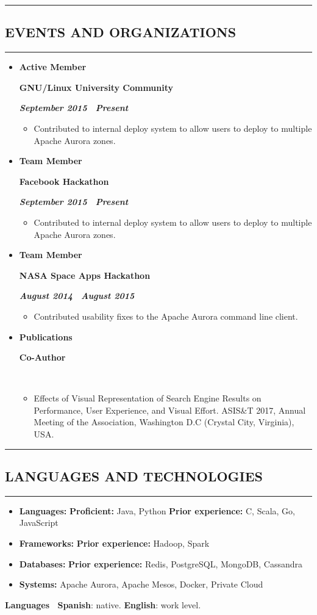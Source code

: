 \documentclass[10pt,letterpaper]{article}
\newcommand{\textbox}[1]{
  \parbox{.333\textwidth}{#1}
}
\newcommand{\CPP}
{C\nolinebreak[4]\hspace{-.05em}\raisebox{.22ex}{\footnotesize\bf ++}}
\newcommand{\sectionTitle}[1]{
  \hrule
  \vspace{-1.0em} 
  \subsection*{\uppercase{\textbf{#1}}}
  \vspace{-0.3em}
    \hrule
}
\newcommand{\languageSection}[4]{
  \vspace{-0.5em}
  \begin{center}
    \textbf{Languages \textendash \ }\textbf{#1}: #2. \textbf{#3}: #4.
  \end{center}
}
\newcommand{\titleExperienceWithoutLocation}[4]{
  \vspace{1.0em}
  
  \item[]
  {
    \textbox{\textbf{#1}\hfill}\textbox{\hfil \textbf{#2}\hfil}\hfill \textbf{\emph{#3 \textendash \ #4}}
  }
}
\begin{document}
  \sectionTitle{Events and Organizations}
  \begin{itemize}[leftmargin=*]
    \parskip=-0.6em 
    \titleExperienceWithoutLocation{Active Member}{GNU/Linux University Community}{September 2015}{Present}
      \begin{itemize}[label=\textbullet]
        \itemsep0em
        \item Contributed to internal deploy system to allow users to deploy to multiple Apache Aurora zones.
      \end{itemize}
  
    \titleExperienceWithoutLocation{Team Member}{Facebook Hackathon}{September 2015}{Present}
      \begin{itemize}[label=\textbullet]
        \itemsep0em
        \item Contributed to internal deploy system to allow users to deploy to multiple Apache Aurora zones.
      \end{itemize}
  
    \titleExperienceWithoutLocation{Team Member}{NASA Space Apps Hackathon}{August 2014}{August 2015}
      \begin{itemize}[label=\textbullet]
        \itemsep0em
        \item Contributed usability fixes to the Apache Aurora command line client.
      \end{itemize}

    \titleExperienceWithoutLocation{Publications}{Co-Author}{}{}
      \begin{itemize}[label=\textbullet]
        \itemsep0em
        \item Effects of Visual Representation of Search Engine Results on Performance, User Experience, and Visual Effort. ASIS\&T 2017,  Annual Meeting of the Association, Washington D.C (Crystal City, Virginia), USA.
      \end{itemize}
    \end{itemize} 
  
  \sectionTitle{Languages and Technologies}
  \vspace{0.20em}
  \begin{itemize}[label=\textbullet]
    \itemsep0em
    \item \textbf{Languages:} \textbf{Proficient:} Java, Python \textbf{Prior experience:} \CPP, Scala, Go, JavaScript
    \item \textbf{Frameworks:} \textbf{Prior experience:} Hadoop, Spark
    \item \textbf{Databases:} \textbf{Prior experience:} Redis, PostgreSQL, MongoDB, Cassandra
    \item \textbf{Systems:} Apache Aurora, Apache Mesos, Docker, Private Cloud
  \end{itemize}
  
  \languageSection{Spanish}{native}{English}{work level}
  
\end{document}
